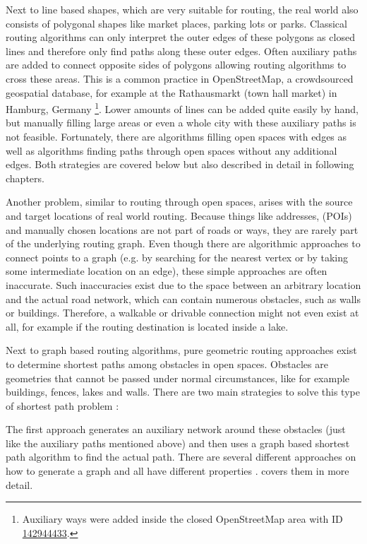 	Next to line based shapes, which are very suitable for routing, the real world also consists of polygonal shapes like market places, parking lots or parks.
	Classical routing algorithms can only interpret the outer edges of these polygons as closed lines and therefore only find paths along these outer edges.
	Often auxiliary paths are added to connect opposite sides of polygons allowing routing algorithms to cross these areas.
	This is a common practice in OpenStreetMap, a crowdsourced geospatial database, for example at the Rathausmarkt (town hall market) in Hamburg, Germany \footnote{Auxiliary ways were added inside the closed OpenStreetMap area with ID  \href{https://www.openstreetmap.org/way/142944433}{142944433}.}.
	Lower amounts of lines can be added quite easily by hand, but manually filling large areas or even a whole city with these auxiliary paths is not feasible.
	Fortunately, there are algorithms filling open spaces with edges as well as algorithms finding paths through open spaces without any additional edges.
	Both strategies are covered below but also described in detail in following chapters.
	
	Another problem, similar to routing through open spaces, arises with the source and target locations of real world routing.
	Because things like addresses,  (POIs) and manually chosen locations are not part of roads or ways, they are rarely part of the underlying routing graph.
	Even though there are algorithmic approaches to connect points to a graph (e.g. by searching for the nearest vertex or by taking some intermediate location on an edge), these simple approaches are often inaccurate.
	Such inaccuracies exist due to the space between an arbitrary location and the actual road network, which can contain numerous obstacles, such as walls or buildings.
	Therefore, a walkable or drivable connection might not even exist at all, for example if the routing destination is located inside a lake.
	
	Next to graph based routing algorithms, pure geometric routing approaches exist to determine shortest paths among obstacles in open spaces.
	Obstacles are geometries that cannot be passed under normal circumstances, like for example buildings, fences, lakes and walls.
	There are two main strategies to solve this type of shortest path problem \cite{hershberger-suri}:
	
	The first approach generates an auxiliary network around these obstacles (just like the auxiliary paths mentioned above) and then uses a graph based shortest path algorithm to find the actual path.
	There are several different approaches on how to generate a graph and all have different properties \cite{graser-osm-open-spaces}.
	 covers them in more detail.
	
